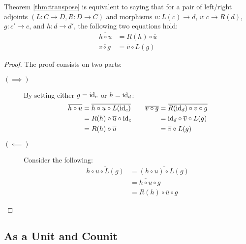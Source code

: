 \begin{theorem}
  Theorem \ref{thm:transpose} is equivalent to saying that for a pair of
  left/right adjoints $(L:C\to D, R:D\to C)$ and morphisms $u:L(c)\to d$,
  $v:c\to R(d)$, $g:c'\to c$, and $h:d\to d'$, the following two equations hold:
  \begin{align*}
    \overline{h\circ u} &= R(h) \circ \overline{u}\\
    \overline{v\circ g} &= \overline{v} \circ L(g)
  \end{align*}

  \begin{proof}
    The proof consists on two parts:
    \begin{description}
      \item[$(\implies)$] By setting either $g=\mathrm{id}_c$ or $h=\mathrm{id}_d$:
        \[
          \begin{aligned}
            \overline{h\circ u}
              &= \overline{h\circ u \circ L(\mathrm{id}_c)}\\
              &= R(h) \circ \overline{u} \circ \mathrm{id}_c\\
              &= R(h) \circ \overline{u}
          \end{aligned}
          \qquad
          \begin{aligned}
            \overline{v\circ g}
              &= \overline{R(\mathrm{id}_d)\circ v\circ g}\\
              &= \mathrm{id}_d \circ \overline{v} \circ L(g)\\
              &= \overline{v} \circ L(g)
          \end{aligned}
        \]
      \item[$(\impliedby)$] Consider the following:
        \[
          \begin{aligned}
            \overline{h \circ u\circ L(g)}
              &= \overline{(h \circ u)\circ L(g)}\\
              &= \overline{h\circ u} \circ g\\
              &= R(h) \circ \overline{u} \circ g
          \end{aligned}
        \]
    \end{description}
  \end{proof}
\end{theorem}

\subsection{As a Unit and Counit}

